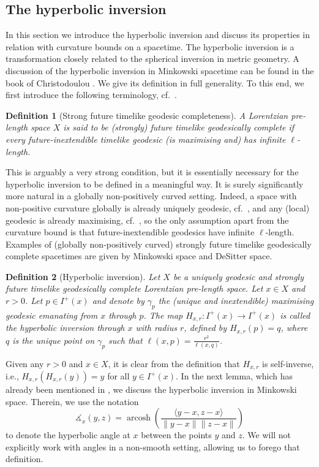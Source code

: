 \documentclass[hidelinks,12pt,a4paper]{article}
\numberwithin{equation}{section}
\theoremstyle{plain}
\newtheorem{definition}{Definition}[section]
\theoremstyle{definition}
\DeclareMathOperator{\arcosh}{arcosh}
\newcommand{\LpLS}{Lo\-rentz\-ian pre-length space }
\newcommand{\LpLSn}{Lo\-rentz\-ian pre-length space}
\newcommand{\ma}{\ensuremath{\measuredangle}}
\begin{document}
\subsection{The hyperbolic inversion}


In this section we introduce the hyperbolic inversion and discuss its properties in relation with curvature bounds on a spacetime. 
The hyperbolic inversion is a transformation closely related to the spherical inversion in metric geometry. 
A discussion of the hyperbolic inversion in Minkowski spacetime can be found in the book of Christodoulou \cite[Section 4.1]{Chr}. 
We give its definition in full generality. 
To this end, we first introduce the following terminology, cf.\ \cite[Definition 5.1]{GKS19}. 

\begin{definition}[Strong future timelike geodesic completeness]
A \LpLS $X$ is said to be (strongly) future timelike geodesically complete if every future-inextendible timelike geodesic (is maximising and) has infinite $\ell$-length.  
\end{definition} 

This is arguably a very strong condition, but it is essentially necessary for the hyperbolic inversion to be defined in a meaningful way. 
It is surely significantly more natural in a globally non-positively curved setting. 
Indeed, a space with non-positive curvature globally is already uniquely geodesic, cf.\ \cite[Theorem 4.7]{BNR25}, and any (local) geodesic is already maximising, cf.\ \cite[Remark 2.6]{EG25+}, so the only assumption apart from the curvature bound is that future-inextendible geodesics have infinite $\ell$-length. Examples of (globally non-positively curved) strongly future timelike geodesically complete spacetimes are given by Minkowski space and DeSitter space.

\begin{definition}[Hyperbolic inversion]
Let $X$ be a uniquely geodesic and strongly future timelike geodesically complete \LpLSn. 
Let $x \in X$ and $r > 0$. 
Let $p \in I^+(x)$ and denote by $\gamma_p$ the (unique and inextendible) maximising geodesic emanating from $x$ through $p$.
The map $H_{x,r} : I^+(x) \to I^+(x)$ is called the hyperbolic inversion through $x$ with radius $r$, defined by $H_{x,r}(p)=q$, where $q$ is the unique point on $\gamma_p$ such that $\ell(x,p)=\frac{r^2}{\ell(x,q)}$.
\end{definition}

Given any $r>0$ and $x \in X$, it is clear from the definition that $H_{x,r}$ is self-inverse, i.e., $H_{x,r}(H_{x,r}(y))=y$ for all $y \in I^+(x)$. 
In the next lemma, which has already been mentioned in \cite[Proposition 7, Section 4.1]{Chr}, we discuss the hyperbolic inversion in Minkowski space. 
Therein, we use the notation 
\[
\ma_x(y,z)=\arcosh \left (\frac{\langle y-x,z-x \rangle}{\|y-x\| \|z-x\|} \right )
\]
to denote the hyperbolic angle at $x$ between the points $y$ and $z$. 
We will not explicitly work with angles in a non-smooth setting, allowing us to forego that definition. 
\end{document}
